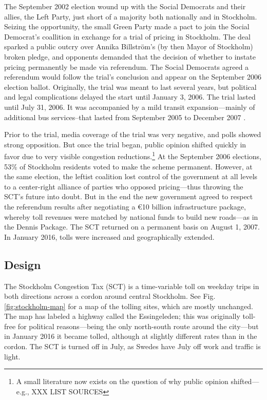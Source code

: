 The September 2002 election wound up with the Social Democrats and their allies, the Left Party, just short of a majority both nationally and in Stockholm. Seizing the opportunity, the small Green Party made a pact to join the Social Democrat's coallition in exchange for a trial of pricing in Stockholm. The deal sparked a public outcry over Annika Billstr\"om's (by then Mayor of Stockholm) broken pledge, and opponents demanded that the decision of whether to instate pricing permanently be made via referendum. The Social Democrats agreed a referendum would follow the trial's conclusion and appear on the September 2006 election ballot. Originally, the trial was meant to last several years, but political and legal complications delayed the start until January 3, 2006. The trial lasted until July 31, 2006. It was accompanied by a mild transit expansion---mainly of additional bus services--that lasted from September 2005 to December 2007 \citep{Kottenhoff2009}.

Prior to the trial, media coverage of the trial was very negative, and polls showed strong opposition. But once the trial began, public opinion shifted quickly in favor due to very visible congestion reductions.\footnote{A small literature now exists on the question of why public opinion shifted---e.g., XXX LIST SOURCES} At the September 2006 elections, 53\% of Stockholm residents voted to make the scheme permanent. However, at the same election, the leftist coalition lost control of the government at all levels to a center-right alliance of parties who opposed pricing---thus throwing the SCT's future into doubt.  But in the end the new government agreed to respect the referendum results after negotiating a \euro 10 billion infrastructure package, whereby toll revenues were matched by national funds to build new roads---as in the Dennis Package. The SCT returned on a permanent basis on August 1, 2007. In January 2016, tolls were increased and geographically extended.

\subsection{Design}

The Stockholm Congestion Tax (SCT) is a time-variable toll on weekday trips in both directions across a cordon around central Stockholm. See Fig. \ref{fig:stockholm-map} for a map of the tolling sites, which are mostly unchanged. The map has labeled a highway called the Essingeleden; this was originally toll-free for political reasons---being the only north-south route around the city---but in January 2016 it became tolled, although at slightly different rates than in the cordon. The SCT is turned off in July, as Swedes have July off work and traffic is light.

